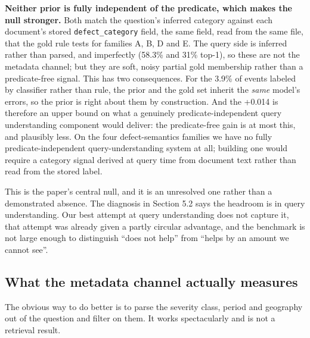 \documentclass[runningheads]{llncs}
\begin{document}
\textbf{Neither prior is fully independent of the predicate, which makes the null stronger.} Both match the question's inferred category against each document's stored \texttt{defect\_category} field, the same field, read from the same file, that the gold rule tests for families A, B, D and E. The query side is inferred rather than parsed, and imperfectly (58.3\% and 31\% top-1), so these are not the metadata channel; but they are soft, noisy partial gold membership rather than a predicate-free signal. This has two consequences. For the 3.9\% of events labeled by classifier rather than rule, the prior and the gold set inherit the \textit{same} model's errors, so the prior is right about them by construction. And the +0.014 is therefore an upper bound on what a genuinely predicate-independent query understanding component would deliver: the predicate-free gain is at most this, and plausibly less. On the four defect-semantics families we have no fully predicate-independent query-understanding system at all; building one would require a category signal derived at query time from document text rather than read from the stored label.

This is the paper's central null, and it is an unresolved one rather than a demonstrated absence. The diagnosis in Section 5.2 says the headroom is in query understanding. Our best attempt at query understanding does not capture it, that attempt was already given a partly circular advantage, and the benchmark is not large enough to distinguish ``does not help'' from ``helps by an amount we cannot see''.


\subsection{What the metadata channel actually measures}
The obvious way to do better is to parse the severity class, period and geography out of the question and filter on them. It works spectacularly and is not a retrieval result.
\end{document}
